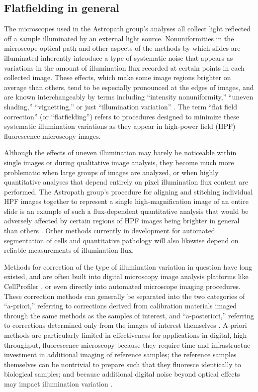 \documentclass[letterpaper,11pt]{article}
\begin{document}
\subsection{Flatfielding in general}
\label{ssec:flatfielding_in_general}

The microscopes used in the Astropath group's analyses all collect light reflected off a sample illuminated by an external light source. Nonuniformities in the microscope optical path and other aspects of the methods by which slides are illuminated inherently introduce a type of systematic noise that appears as variations in the amount of illumination flux recorded at certain points in each collected image. These effects, which make some image regions brighter on average than others, tend to be especially pronounced at the edges of images, and are known interchangeably by terms including ``intensity nonuniformity,'' ``uneven shading,'' ``vignetting,'' or just ``illumination variation'' \cite{doi:10.1111/jmi.12178}. The term ``flat field correction'' (or ``flatfielding'') refers to procedures designed to minimize these systematic illumination variations as they appear in high-power field (HPF) fluorescence microscopy images. 

Although the effects of uneven illumination may barely be noticeable within single images or during qualitative image analysis, they become much more problematic when large groups of images are analyzed, or when highly quantitative analyses that depend entirely on pixel illumination flux content are performed. The Astropath group's procedure for aligning and stitching individual HPF images together to represent a single high-magnification image of an entire slide is an example of such a flux-dependent quantitative analysis that would be adversely affected by certain regions of HPF images being brighter in general than others \cite{Heshy}. Other methods currently in development for automated segmentation of cells and quantitative pathology will also likewise depend on reliable measurements of illumination flux.

Methods for correction of the type of illumination variation in question have long existed, and are often built into digital microscopy image analysis platforms like CellProfiler \cite{Carpenter2006}, or even directly into automated microscope imaging procedures. These correction methods can generally be separated into the two categories of ``a-priori,'' referring to corrections derived from calibration materials imaged through the same methods as the samples of interest, and ``a-posteriori,'' referring to corrections determined only from the images of interest themselves \cite{18770694}. A-priori methods are particularly limited in effectiveness for applications in digital, high-throughput, fluorescence microscopy because they require time and infrastructue investment in additional imaging of reference samples; the reference samples themselves can be nontrivial to prepare such that they fluoresce identically to biological samples; and because additional digital noise beyond optical effects may impact illumination variation \cite{doi:10.1111/jmi.12178}.
\end{document}
